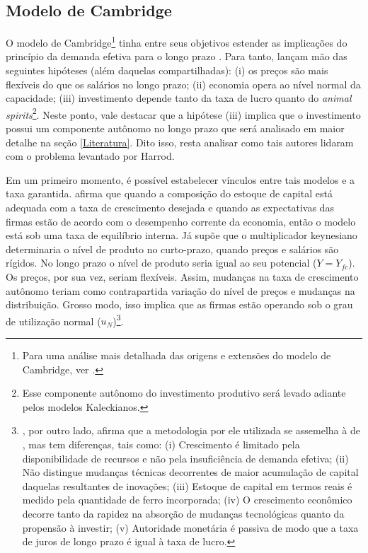 \subsection{Modelo de Cambridge}

O modelo de Cambridge\footnote{Para uma análise mais detalhada das origens e extensões do modelo de Cambridge, ver \textcite{baranzini_cambridge_2013}.} tinha entre seus objetivos estender as implicações do princípio da demanda efetiva para o longo prazo  \cites{kaldor_alternative_1955}{kaldor_model_1957}{robinson_model_1962}{pasinetti_rate_1962}. Para tanto, lançam mão das seguintes hipóteses (além daquelas compartilhadas): (i) os preços são mais flexíveis do que os salários no longo prazo; (ii) economia opera ao nível normal da capacidade; (iii) investimento depende tanto da taxa de lucro quanto do \textit{animal spirits}\footnote{Esse componente autônomo do investimento produtivo será levado adiante pelos modelos Kaleckianos.}. Neste ponto, vale destacar que a hipótese (iii) implica que o investimento possui um componente autônomo no longo prazo que será analisado em maior detalhe na seção \ref{Literatura}. Dito isso, resta analisar como tais autores lidaram com o problema levantado por Harrod.

Em um primeiro momento, é possível estabelecer vínculos entre tais modelos e a taxa garantida. \textcite{robinson_model_1962} afirma que quando a composição do estoque de capital está adequada com a taxa de crescimento desejada e quando as expectativas das firmas estão de acordo com o desempenho corrente da economia, então o modelo está sob uma taxa de equilíbrio interna. Já \textcite{kaldor_alternative_1955} supõe que o multiplicador keynesiano determinaria o nível de produto no curto-prazo, quando preços e salários são rígidos. No longo prazo o nível de produto seria igual ao seu potencial ($Y = Y_{fc}$). Os preços, por sua vez, seriam flexíveis. Assim, mudanças na taxa de crescimento autônomo teriam como contrapartida variação do nível de preços e mudanças na distribuição. Grosso modo, isso implica que as firmas estão operando sob o grau de utilização normal ($u_N$)\footnote{\textcite{kaldor_model_1957}, por outro lado, afirma que a metodologia por ele utilizada se assemelha à de \textcite{harrod_essay_1939}, mas tem diferenças, tais como: (i) Crescimento é limitado pela disponibilidade de recursos e não pela insuficiência de demanda efetiva; (ii) Não distingue mudanças técnicas decorrentes de maior acumulação de capital daquelas resultantes de inovações; (iii) Estoque de capital em termos reais é medido pela quantidade de ferro incorporada; (iv) O crescimento econômico decorre tanto da rapidez na absorção de mudanças tecnológicas quanto da propensão à investir; (v) Autoridade monetária é passiva de modo que a taxa de juros de longo prazo é igual à taxa de lucro.}. 

